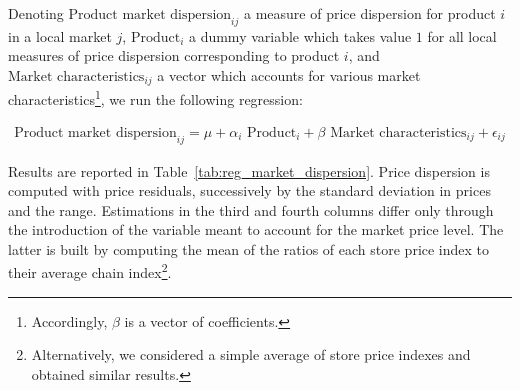 \documentclass[english]{article}
\begin{document}
Denoting $\text{Product market dispersion}_{ij}$ a measure of price dispersion for product $i$ in a local market $j$, $\text{Product}_i$ a dummy variable which takes value $1$ for all local measures of price dispersion corresponding to product $i$, and $\text{Market characteristics}_{ij}$ a vector which accounts for various market characteristics\footnote{Accordingly, $\beta$ is a vector of coefficients.}, we run the following regression:

\begin{align}
\text{Product market dispersion}_{ij} = \mu + \alpha_i \text{ Product}_i + \beta \text{ Market characteristics}_{ij} + \epsilon_{ij}
\label{reg_store_dispersion}
\end{align}

Results are reported in Table~\ref{tab:reg_market_dispersion}. Price dispersion is computed with price residuals, successively by the standard deviation in prices and the range. Estimations in the third and fourth columns differ only through the introduction of the variable meant to account for the market price level. The latter is built by computing the mean of the ratios of each store price index to their average chain index\footnote{Alternatively, we considered a simple average of store price indexes and obtained similar results.}.
\end{document}
